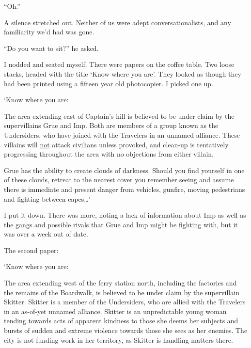 ``Oh.''



A silence stretched out.  Neither of us were adept conversationalists, and any familiarity we'd had was gone.



``Do you want to sit?'' he asked.



I nodded and seated myself.  There were papers on the coffee table.  Two loose stacks, headed with the title `Know where you are'.  They looked as though they had been printed using a fifteen year old photocopier.  I picked one up.



`Know where you are:



The area extending east of Captain's hill is believed to be under claim by the supervillains Grue and Imp.  Both are members of a group known as the Undersiders, who have joined with the Travelers in an unnamed alliance.  These villains will \underline{not} attack civilians unless provoked, and clean-up is tentatively progressing throughout the area with no objections from either villain.



Grue has the ability to create clouds of darkness.  Should you find yourself in one of these clouds, retreat to the nearest cover you remember seeing and assume there is immediate and present danger from vehicles, gunfire, moving pedestrians and fighting between capes\ldots'



I put it down.  There was more, noting a lack of information about Imp as well as the gangs and possible rivals that Grue and Imp might be fighting with, but it was over a week out of date.



The second paper:



`Know where you are:



The area extending west of the ferry station north, including the factories and the remains of the Boardwalk, is believed to be under claim by the supervillain Skitter.  Skitter is a member of the Undersiders, who are allied with the Travelers in an as-of-yet unnamed alliance.  Skitter is an unpredictable young woman tending towards acts of apparent kindness to those she deems her subjects and bursts of sudden and extreme violence towards those she sees as her enemies.  The city is not funding work in her territory, as Skitter is handling matters there.



